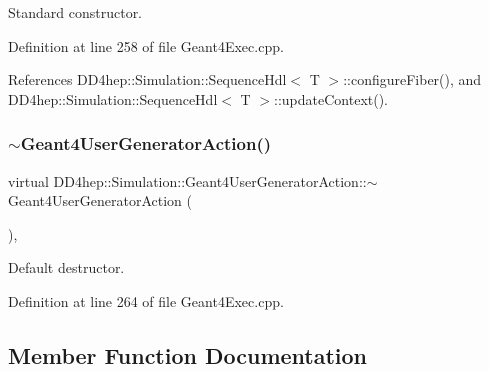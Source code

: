 Standard constructor. 



Definition at line 258 of file Geant4\+Exec.\+cpp.



References D\+D4hep\+::\+Simulation\+::\+Sequence\+Hdl$<$ T $>$\+::configure\+Fiber(), and D\+D4hep\+::\+Simulation\+::\+Sequence\+Hdl$<$ T $>$\+::update\+Context().

\hypertarget{class_d_d4hep_1_1_simulation_1_1_geant4_user_generator_action_a4fa904700f82d5bcce7a2c5d774d529f}{}\label{class_d_d4hep_1_1_simulation_1_1_geant4_user_generator_action_a4fa904700f82d5bcce7a2c5d774d529f} 
\subsubsection{\texorpdfstring{$\sim$\+Geant4\+User\+Generator\+Action()}{~Geant4UserGeneratorAction()}}
{\footnotesize\ttfamily virtual D\+D4hep\+::\+Simulation\+::\+Geant4\+User\+Generator\+Action\+::$\sim$\+Geant4\+User\+Generator\+Action (\begin{DoxyParamCaption}{ }\end{DoxyParamCaption})\hspace{0.3cm}{\ttfamily [inline]}, {\ttfamily [virtual]}}



Default destructor. 



Definition at line 264 of file Geant4\+Exec.\+cpp.



\subsection{Member Function Documentation}
\hypertarget{class_d_d4hep_1_1_simulation_1_1_geant4_user_generator_action_a6e5a2cb71388c8358f6fa8679ca9cf69}{}\label{class_d_d4hep_1_1_simulation_1_1_geant4_user_generator_action_a6e5a2cb71388c8358f6fa8679ca9cf69} 
